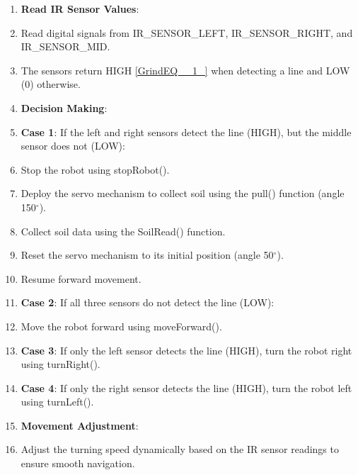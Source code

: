 \documentclass{book} %
\begin{document}
\begin{enumerate}
\item \textbf{ Read IR Sensor Values}:

\item  Read digital signals from IR\_SENSOR\_LEFT, IR\_SENSOR\_RIGHT, and IR\_SENSOR\_MID.

\item  The sensors return HIGH \eqref{GrindEQ__1_} when detecting a line and LOW (0) otherwise.

\item  \textbf{Decision Making}:

\item  \textbf{Case 1}: If the left and right sensors detect the line (HIGH), but the middle sensor does not (LOW):

\item  Stop the robot using stopRobot().

\item  Deploy the servo mechanism to collect soil using the pull() function (angle 150$\mathrm{{}^\circ}$).

\item  Collect soil data using the SoilRead() function.

\item  Reset the servo mechanism to its initial position (angle 50$\mathrm{{}^\circ}$).

\item  Resume forward movement.

\item  \textbf{Case 2}: If all three sensors do not detect the line (LOW):

\item  Move the robot forward using moveForward().

\item  \textbf{Case 3}: If only the left sensor detects the line (HIGH), turn the robot right using turnRight().

\item  \textbf{Case 4}: If only the right sensor detects the line (HIGH), turn the robot left using turnLeft().

\item  \textbf{Movement Adjustment}:

\item  Adjust the turning speed dynamically based on the IR sensor readings to ensure smooth navigation.
\end{enumerate}
\end{document}
